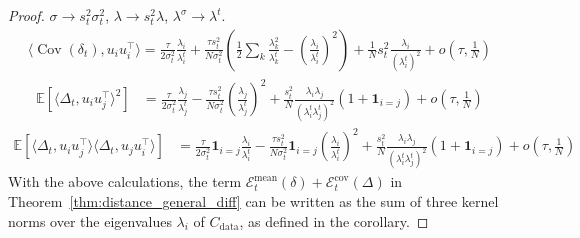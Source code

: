 \documentclass[11pt]{article}
\newcommand{\cov}{\operatorname{Cov}}
\begin{document}
\begin{proof}
$\sigma \to s_t^2 \sigma_t^2$, $\lambda \to s_t^2 \lambda$, $\lambda^\sigma \to \lambda^t$.
\begin{align*}
    \langle \cov(\delta_{t}), u_i u_i^\top \rangle = \frac{\tau}{2\sigma_t^2} \frac{\lambda_i}{\lambda^t_i}
    +  \frac{\tau s_t^2 }{N \sigma_t^2} \left( \frac{1}{2} \sum_k \frac{\lambda_k^2}{\lambda^t_k}- \left(\frac{\lambda_i}{\lambda^t_i}\right)^2 \right) 
    + \frac{1}{N} s_t^2 \frac{\lambda_i}{(\lambda^t_i)^2}
    +  o \left(\tau, \frac{1}{N}\right) 
\end{align*}
\begin{align*}
      \mathbb{E}[\langle \Delta_{t}, u_i u_j^\top \rangle^2]
      &=  \frac{\tau}{2\sigma_t^2} \frac{\lambda_j}{\lambda^t_j} - \frac{\tau s_t^2 }{N \sigma_t^2 } \left( \frac{\lambda_j}{\lambda^t_j}\right)^2 + \frac{s_t^2}{N}\frac{\lambda_i \lambda_j}{(\lambda^t_i \lambda^t_j)^2}( 1  + \mathbf{1}_{i=j})  + o \left(\tau, \frac{1}{N}\right) 
    \end{align*}
\begin{align*}
    \mathbb{E}[\langle \Delta_{t}, u_i u_j^\top \rangle \langle \Delta_{t}, u_j u_i^\top \rangle]
      &=  \frac{\tau}{2\sigma_t^2} \mathbf{1}_{i=j} \frac{\lambda_i}{\lambda^t_i} - \frac{\tau s_t^2}{N \sigma_t^2 } \mathbf{1}_{i=j} \left( \frac{\lambda_i}{\lambda^t_i}\right)^2 + \frac{s_t^2}{N}\frac{\lambda_i \lambda_j}{(\lambda^t_i \lambda^t_j)^2}( 1  + \mathbf{1}_{i=j})  + o \left(\tau, \frac{1}{N}\right) 
    \end{align*}
With the above calculations, the term $ \mathcal{E}_{t}^{\text{mean}}(\delta) + \mathcal{E}_{t}^{\text{cov}}(\Delta)$ in Theorem~\ref{thm:distance_general_diff} can be written as the sum of three kernel norms over the eigenvalues $\lambda_i$ of $C_{\mathrm{data}}$, as defined in the corollary.


\end{proof}
\end{document}
